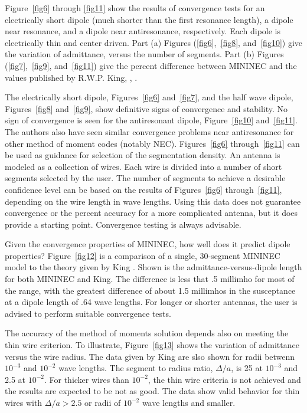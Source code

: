 \documentclass[12pt]{article}
\begin{document}
Figure~\ref{fig6} through \ref{fig11} show the results of convergence
tests for an electrically short dipole (much shorter than the first
resonance length), a dipole near resonance, and a dipole near
antiresonance, respectively. Each dipole is electrically thin and center
driven. Part (a) Figures (\ref{fig6},~\ref{fig8}, and~\ref{fig10}) give
the variation of admittance, versus the number of segments. Part (b)
Figures (\ref{fig7},~\ref{fig9}, and~\ref{fig11}) give the percent
difference between MININEC and the values published by R.W.P. King,
\cite{r8}, \cite{r9}.

The electrically short dipole, Figures~\ref{fig6} and~\ref{fig7}, and
the half wave dipole, Figures~\ref{fig8} and~\ref{fig9}, show definitive
signs of convergence and stability. No sign of convergence is seen for
the antiresonant dipole, Figure~\ref{fig10} and~\ref{fig11}. The authors
also have seen similar convergence problems near antiresonance for other
method of moment codes (notably NEC). Figures~\ref{fig6}
through~\ref{fig11} can be used as guidance for selection of the
segmentation density. An antenna is modeled as a collection of wires.
Each wire is divided into a number of short segments selected by the
user. The number of segments to achieve a desirable confidence level can
be based on the results of Figures~\ref{fig6} through~\ref{fig11},
depending on the wire length in wave lengths. Using this data does not
guarantee convergence or the percent accuracy for a more complicated
antenna, but it does provide a starting point. Convergence testing is
always advisable.

Given the convergence properties of MININEC, how well does it predict
dipole properties? Figure~\ref{fig12} is a comparison of a single,
30-segment MININEC model to the theory given by King
\cite{r9}. Shown is the admittance-versus-dipole length for
both MININEC and King. The difference is less that .5 millimho for most
of the range, with the greatest difference of about 1.5 millimhos in the
susceptance at a dipole length of .64 wave lengths. For longer or
shorter antennas, the user is advised to perform suitable convergence
tests.

The accuracy of the method of moments solution depends also on meeting
the thin wire criterion. To illustrate, Figure~\ref{fig13} shows the
variation of admittance versus the wire radius. The data given by King
\cite{r9} are slso shown for radii betwenn $10^{-3}$ and
$10^{-2}$ wave lengths. The segment to radius ratio, $\Delta/a$, is 25
at $10^{-3}$ and 2.5 at $10^{-2}$. For thicker wires than $10^{-2}$, the
thin wire criteria is not achieved and the results are expected to be
not as good. The data show valid behavior for thin wires with
$\Delta/a > 2.5$ or radii of $10^{-2}$ wave lengths and smaller.
\end{document}
